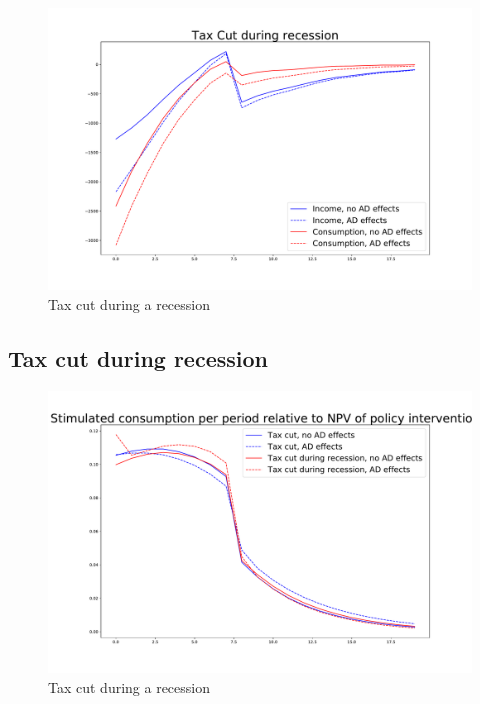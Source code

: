 \documentclass[]{article}
\begin{document}
\begin{figure} 
	\begin{centering}
		\includegraphics[width=\linewidth]{../taxcut_recession.pdf}
		\caption{Tax cut during a recession}
		\label{fig:taxcutrecession}
	\end{centering}
\end{figure}

\FloatBarrier
\subsection{Tax cut during recession}

\begin{figure} 
	\begin{centering}
		\includegraphics[width=\linewidth]{../stimulated-consumption.pdf}
		\caption{Tax cut during a recession}
		\label{fig:taxcutrecession}
	\end{centering}
\end{figure}
\end{document}
